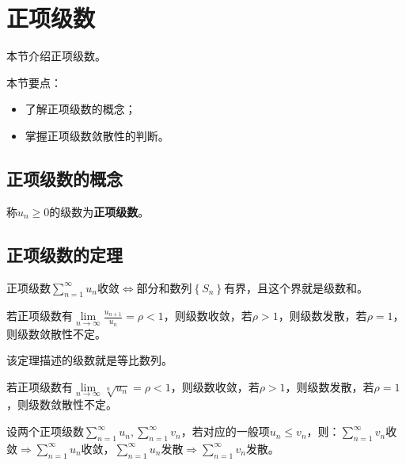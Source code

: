 \section{正项级数}

本节介绍正项级数。

本节要点：
\begin{itemize}
    \item 了解正项级数的概念；
    \item 掌握正项级数敛散性的判断。
\end{itemize}

\subsection{正项级数的概念}

\begin{definition}[正项级数]
称$u_n\geqslant 0$的级数为{\bf 正项级数}。
\end{definition}

\subsection{正项级数的定理}

\begin{theorem}
正项级数$\sum_{n=1}^{\infty}{u_n}$收敛$\Leftrightarrow $部分和数列$\left\{ S_n \right\} $有界，且这个界就是级数和。
\end{theorem}

\begin{theorem}[达朗贝尔判别法]
若正项级数有$\underset{n\rightarrow \infty}{\lim}\frac{u_{n+1}}{u_n}=\rho <1$，则级数收敛，若$\rho >1$，则级数发散，若$\rho =1$，则级数敛散性不定。
\end{theorem}

该定理描述的级数就是等比数列。

\begin{theorem}[柯西判别法]
若正项级数有$\underset{n\rightarrow \infty}{\lim}\sqrt[n]{u_n}=\rho <1$，则级数收敛，若$\rho >1$，则级数发散，若$\rho =1$，则级数敛散性不定。
\end{theorem}

\begin{theorem} \label{th_12_2_1}
设两个正项级数$\sum_{n=1}^{\infty}{u_n},\sum_{n=1}^{\infty}{v_n}$，若对应的一般项$u_n\leqslant v_n$，则：$\sum_{n=1}^{\infty}{v_n}$收敛$\Rightarrow \sum_{n=1}^{\infty}{u_n}$收敛，$\sum_{n=1}^{\infty}{u_n}$发散$\Rightarrow \sum_{n=1}^{\infty}{v_n}$发散。
\end{theorem}

